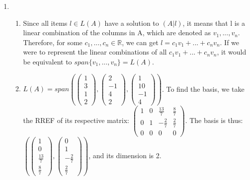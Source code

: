 \documentclass{article}
\begin{document}
\begin{enumerate}
\begin{enumerate}
\end{enumerate}

\item

\begin{enumerate}

\item Since all items $l \in L(A)$ have a solution to $(A|l)$, it means that l is a linear combination of the columns in A, which are denoted as $v_1,...,v_n$. Therefore, for some $c_1,...,c_n \in \mathbb{R}$, we can get $l = c_1 v_1 + ... + c_n v_n$. If we were to represent the linear combinations of all $c_1 v_1  + ... + c_n v_n$, it would be equivalent to $span\{v_1,...,v_n\} = L(A)$.

\item $L(A) = span \left( \left(\begin{array}{c} 1 \\ 3 \\ 1 \\ 2 \end{array}\right), \left( \begin{array}{c} 2 \\ -1 \\ 4 \\ 2 \end{array}\right), \left( \begin{array}{c} 1 \\ 10 \\ -1 \\ 4 \end{array}
\right)\right)$. To find the basis, we take the RREF of its respective matrix: $\left(\begin{array}{cccc} 1 & 0 & \frac{13}{7} & \frac{8}{7} \\ 0 & 1 & -\frac{2}{7} & \frac{2}{7} \\ 0 & 0 & 0 & 0 \end{array}\right)$. The basis is thus: $\left(\left(\begin{array}{c} 1 \\ 0 \\ \frac{13}{7} \\ \frac{8}{7} \end{array}\right), \left(\begin{array}{c} 0 \\ 1 \\ -\frac{2}{7} \\ \frac{2}{7} \end{array}\right) \right)$, and its dimension is 2.


\end{enumerate}
\end{enumerate}
\end{document}

